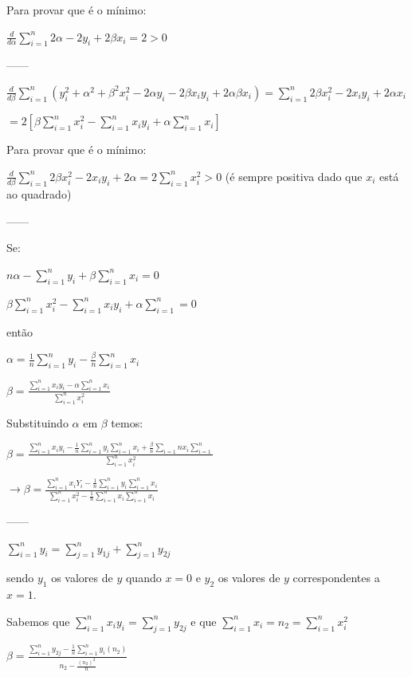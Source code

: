 \documentclass[11pt,]{article}
\begin{document}
Para provar que é o mínimo:

\(\frac{d}{d \alpha} \sum_{i=1}^n 2 \alpha - 2 y_{i} + 2 \beta x_{i} = 2 > 0\)

------

\(\frac{d}{d \beta} \sum_{i=1}^n ( y_{i}^2 + \alpha^2 + \beta^2 x_{i}^2 - 2 \alpha y_{i} - 2 \beta x_{i} y_{i} + 2 \alpha \beta x_{i}) = \sum_{i=1}^n 2 \beta x_{i}^2 - 2 x_{i} y_{i} +2 \alpha x_{i}\)

\(= 2 [\beta \sum_{i=1}^n x_{i}^2 - \sum_{i=1}^n x_{i} y_ {i} + \alpha \sum_{i=1}^n x_{i}]\)

Para provar que é o mínimo:

\(\frac{d}{d \beta} \sum_{i=1}^n 2 \beta x_{i}^2 - 2 x_{i} y_{i} +2 \alpha= 2 \sum_{i=1}^n x_{i}^2 >0\)
(é sempre positiva dado que \(x_{i}\) está ao quadrado)

------

Se:

\(n \alpha - \sum_{i=1}^n y_{i} + \beta \sum_{i=1}^n x_{i} = 0\)

\(\beta \sum_{i=1}^n x_{i}^2 - \sum_{i=1}^n x_{i} y_{i} + \alpha \sum_{i=1}^n = 0\)

então

\(\alpha = \frac{1}{n} \sum_{i=1}^n y_{i} - \frac{ \beta}{n} \sum_{i=1}^n x_{i}\)

\(\beta = \frac{ \sum_{i=1}^n x_{i} y_{i} - \alpha \sum_{i=1}^n x_{i}}{\sum_{i=1}^n x_{i}^2}\)

Substituindo \(\alpha\) em \(\beta\) temos:

\(\beta = \frac{ \sum_{i=1}^n x_{i} y_{i} - \frac{1}{n} \sum_{i=1}^n y_{i} \sum_{i=1}^n x_{i} + \frac{\beta}{n} \sum_{i=1}{n}x_{i} \sum_{i=1}^n} {\sum_{i=1}^n x_{i}^2}\)

\(\rightarrow \beta = \frac{\sum_{i=1}^n x_{i} Y_{i} - \frac{1}{n} \sum_{i=1}^n y_{i} \sum_{i=1}^n x_{i}}{\sum_{i=1}^n x_{i}^2 - \frac{1}{n} \sum_{i=1}^n x_{i} \sum_{i=1}^n x_{i}}\)

------

\(\sum_{i=1}^n y_{i}= \sum_{j=1}^n y_{1j} + \sum_{j=1}^n y_{2j}\)

sendo \(y_{1}\) os valores de \(y\) quando \(x=0\) e \(y_{2}\) os
valores de \(y\) correspondentes a \(x=1\).

Sabemos que \(\sum_{i=1}^n x_{i} y_{i} = \sum_{j=1}^ny_{2j}\) e que
\(\sum_{i=1}^n x_{i} = n_{2} = \sum_{i=1}^n x_{i}^2\)

\(\beta = \frac{\sum_{i=1}^n y_{2j} - \frac{1}{n} \sum_{i=1}^n y_{i}(n_{2})}{n_{2}- \frac{(n_{2})^2}{n}}\)
\end{document}
